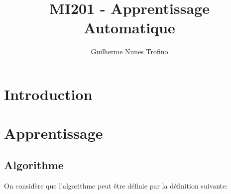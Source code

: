 \documentclass{article}
\title{MI201 - Apprentissage Automatique}
\author{Guilherme Nunes Trofino}
\begin{document}
\maketitle
\setlength{\parindent}{0pt}

\newpage\tableofcontents

\section{Introduction}


\section{Apprentissage}
\subsection{Algorithme}
On considère que l'algorithme peut être définie par la définition suivante:
\end{document}
